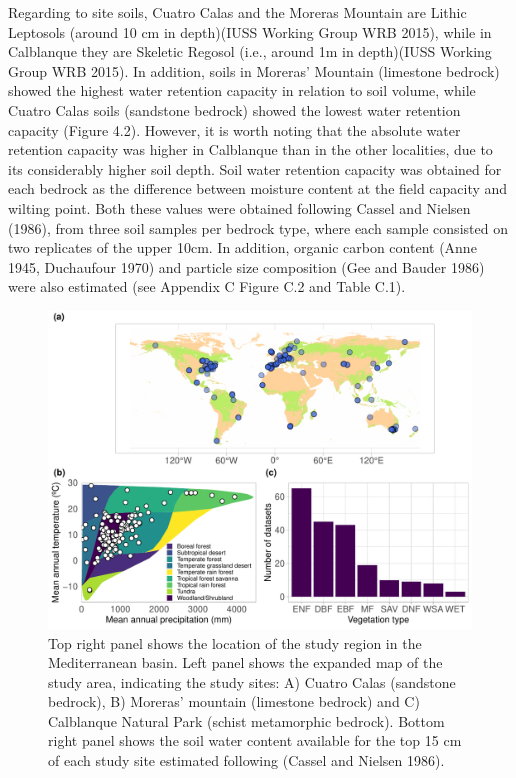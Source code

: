 \documentclass[11pt,twoside]{reedthesis}
\begin{document}
Regarding to site soils, Cuatro Calas and the Moreras Mountain are
Lithic Leptosols (around 10 cm in depth)(IUSS Working Group WRB 2015),
while in Calblanque they are Skeletic Regosol (i.e., around 1m in
depth)(IUSS Working Group WRB 2015). In addition, soils in Moreras'
Mountain (limestone bedrock) showed the highest water retention capacity
in relation to soil volume, while Cuatro Calas soils (sandstone bedrock)
showed the lowest water retention capacity (Figure 4.2). However, it is
worth noting that the absolute water retention capacity was higher in
Calblanque than in the other localities, due to its considerably higher
soil depth. Soil water retention capacity was obtained for each bedrock
as the difference between moisture content at the field capacity and
wilting point. Both these values were obtained following Cassel and
Nielsen (1986), from three soil samples per bedrock type, where each
sample consisted on two replicates of the upper 10cm. In addition,
organic carbon content (Anne 1945, Duchaufour 1970) and particle size
composition (Gee and Bauder 1986) were also estimated (see Appendix C
Figure C.2 and Table C.1).

\setlength{\abovecaptionskip}{10pt}
\begin{figure}[hbt!]

{\centering \includegraphics[width=1\linewidth]{figure/CH3/figure2} 

}

\caption[Study site and its soil water content availability]{Top right panel shows the location of the study region in the Mediterranean basin. Left panel shows the expanded map of the study area, indicating the study sites: A) Cuatro Calas (sandstone bedrock), B) Moreras’ mountain (limestone bedrock) and C) Calblanque Natural Park (schist metamorphic bedrock). Bottom right panel shows the soil water content available for the top 15 cm of each study site estimated following (Cassel and Nielsen 1986).}\label{fig:Ch3plot2}
\end{figure}
\end{document}
